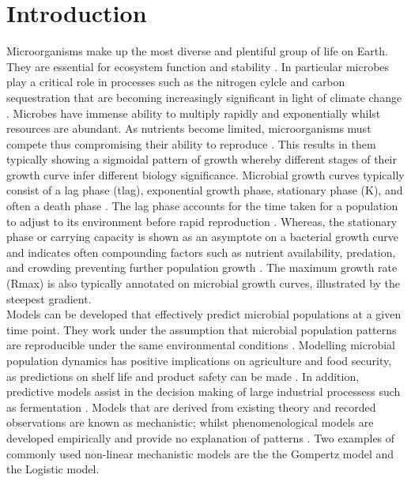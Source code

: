 \documentclass[12pt]{article}
\begin{document}
  \section{Introduction}
  \linenumbers
Microorganisms make up the most diverse and plentiful group of life on Earth. They are essential for ecosystem function and stability \cite{Shoemaker2021}. In particular microbes play a critical role in processes such as the nitrogen cylcle and carbon sequestration that are becoming increasingly significant in light of climate change \cite{Gupta2016}. Microbes have immense ability to multiply rapidly and exponentially whilst resources are abundant. As nutrients become limited, microorganisms must compete thus compromising their ability to reproduce \cite{NatRevMicro}. This results in them typically showing a sigmoidal pattern of growth whereby different stages of their growth curve infer different biology significance. Microbial growth curves typically consist of a lag phase (tlag), exponential growth phase, stationary phase (K), and often a death phase \cite{Zwietering1990}. The lag phase accounts for the time taken for a population to adjust to its environment before rapid reproduction \cite{BUCHANAN1997313}. Whereas, the stationary phase or carrying capacity is shown as an asymptote on a bacterial growth curve and indicates often compounding factors such as nutrient availability, predation, and crowding preventing further population growth \cite{WACHENHEIM2003157}. The maximum growth rate (Rmax) is also typically annotated on microbial growth curves, illustrated by the steepest gradient.\\
     
Models can be developed that effectively predict microbial populations at a given time point. They work under the assumption that microbial population patterns are reproducible under the same environmental conditions \cite{Pla2015}. Modelling microbial population dynamics has positive implications on agriculture and food security, as predictions on shelf life and product safety can be made \cite{Zwietering1990}. In addition, predictive models assist in the decision making of large industrial processess such as fermentation \cite{Garcia2021}. Models that are derived from existing theory and recorded observations are known as mechanistic; whilst phenomenological models are developed empirically and provide no explanation of patterns \cite{doi:10.1080/10408398.2011.570463}. Two examples of commonly used non-linear mechanistic models are the the Gompertz model and the Logistic model.\\
\end{document}
